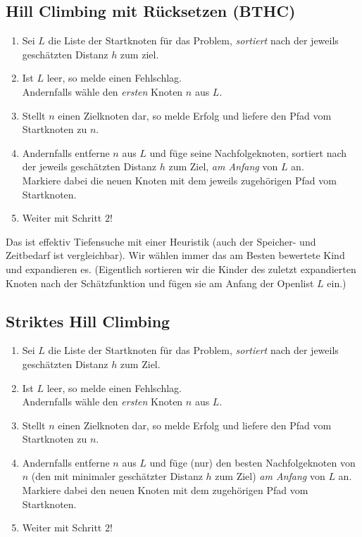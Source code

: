 \documentclass[runningheads,deutsch]{llncs}
\begin{document}
\subsection{Hill Climbing mit Rücksetzen (BTHC)}

\begin{enumerate}
    \item Sei $L$ die Liste der Startknoten für das Problem, \textit{sortiert} nach der jeweils geschätzten Distanz $h$ zum ziel.
    \item Ist $L$ leer, so melde einen Fehlschlag. \\ Andernfalls wähle den \textit{ersten} Knoten $n$ aus $L$.
    \item Stellt $n$ einen Zielknoten dar, so melde Erfolg und liefere den Pfad vom Startknoten zu $n$.
    \item Andernfalls entferne $n$ aus $L$ und füge seine Nachfolgeknoten, sortiert nach der jeweils geschätzten Distanz $h$ zum Ziel, \textit{am Anfang} von $L$ an. \\ Markiere dabei die neuen Knoten mit dem jeweils zugehörigen Pfad vom Startknoten.
    \item Weiter mit Schritt $2$!
\end{enumerate}

Das ist effektiv Tiefensuche mit einer Heuristik (auch der Speicher- und Zeitbedarf ist vergleichbar). Wir wählen immer das am Besten bewertete Kind und expandieren es. (Eigentlich sortieren wir die Kinder des zuletzt expandierten Knoten nach der Schätzfunktion und fügen sie am Anfang der Openlist $L$ ein.)

\subsection{Striktes Hill Climbing}

\begin{enumerate}
    \item Sei $L$ die Liste der Startknoten für das Problem, \textit{sortiert} nach der jeweils geschätzten Distanz $h$ zum Ziel.
    \item Ist $L$ leer, so melde einen Fehlschlag. \\ Andernfalls wähle den \textit{ersten} Knoten $n$ aus $L$.
    \item Stellt $n$ einen Zielknoten dar, so melde Erfolg und liefere den Pfad vom Startknoten zu $n$.
    \item Andernfalls entferne $n$ aus $L$ und füge (nur) den besten Nachfolgeknoten von $n$ (den mit minimaler geschätzter Distanz $h$ zum Ziel) \textit{am Anfang} von $L$ an. \\ Markiere dabei den neuen Knoten mit dem zugehörigen Pfad vom Startknoten.
    \item Weiter mit Schritt $2$!
\end{enumerate}
\end{document}
